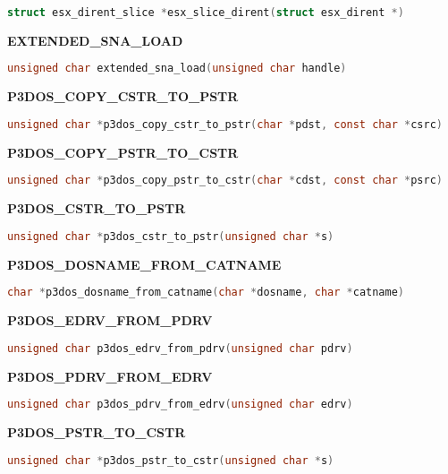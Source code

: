 \begin{lstlisting}[language=C]
struct esx_dirent_slice *esx_slice_dirent(struct esx_dirent *)
\end{lstlisting}

\textbf{EXTENDED\_SNA\_LOAD}

\begin{lstlisting}[language=C]
unsigned char extended_sna_load(unsigned char handle)
\end{lstlisting}

\textbf{P3DOS\_COPY\_CSTR\_TO\_PSTR}

\begin{lstlisting}[language=C]
unsigned char *p3dos_copy_cstr_to_pstr(char *pdst, const char *csrc)
\end{lstlisting}

\textbf{P3DOS\_COPY\_PSTR\_TO\_CSTR}

\begin{lstlisting}[language=C]
unsigned char *p3dos_copy_pstr_to_cstr(char *cdst, const char *psrc)
\end{lstlisting}

\textbf{P3DOS\_CSTR\_TO\_PSTR}

\begin{lstlisting}[language=C]
unsigned char *p3dos_cstr_to_pstr(unsigned char *s)
\end{lstlisting}

\textbf{P3DOS\_DOSNAME\_FROM\_CATNAME}

\begin{lstlisting}[language=C]
char *p3dos_dosname_from_catname(char *dosname, char *catname)
\end{lstlisting}

\textbf{P3DOS\_EDRV\_FROM\_PDRV}

\begin{lstlisting}[language=C]
unsigned char p3dos_edrv_from_pdrv(unsigned char pdrv)
\end{lstlisting}

\textbf{P3DOS\_PDRV\_FROM\_EDRV}

\begin{lstlisting}[language=C]
unsigned char p3dos_pdrv_from_edrv(unsigned char edrv)
\end{lstlisting}

\textbf{P3DOS\_PSTR\_TO\_CSTR}

\begin{lstlisting}[language=C]
unsigned char *p3dos_pstr_to_cstr(unsigned char *s)
\end{lstlisting}
